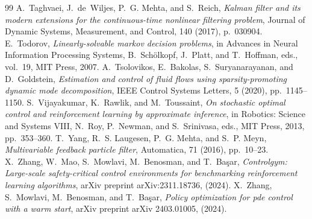 \documentclass[10pt,a4paper]{amsart}
\begin{document}
\begin{thebibliography}{99}
 {\sc A.~Taghvaei, J.~de~Wiljes, P.~G. Mehta, and S.~Reich}, {\em Kalman filter and its modern extensions for the continuous-time nonlinear filtering problem}, Journal of Dynamic Systems, Measurement, and Control, 140 (2017), p.~030904.
 {\sc E.~Todorov}, {\em Linearly-solvable markov decision problems}, in Advances in Neural Information Processing Systems, B.~Sch\"{o}lkopf, J.~Platt, and T.~Hoffman, eds., vol.~19, MIT Press, 2007.
 {\sc A.~Tsolovikos, E.~Bakolas, S.~Suryanarayanan, and D.~Goldstein}, {\em Estimation and control of fluid flows using sparsity-promoting dynamic mode decomposition}, IEEE Control Systems Letters, 5 (2020), pp.~1145--1150.
 {\sc S.~Vijayakumar, K.~Rawlik, and M.~Toussaint}, {\em On stochastic optimal control and reinforcement learning by approximate inference}, in Robotics: Science and Systems VIII, N.~Roy, P.~Newman, and S.~Srinivasa, eds., MIT Press, 2013, pp.~353--360.
 {\sc T.~Yang, R.~S. Laugesen, P.~G. Mehta, and S.~P. Meyn}, {\em Multivariable feedback particle filter}, Automatica, 71 (2016), pp.~10--23.
 {\sc X.~Zhang, W.~Mao, S.~Mowlavi, M.~Benosman, and T.~Ba{\c{s}}ar}, {\em Controlgym: Large-scale safety-critical control environments for benchmarking reinforcement learning algorithms}, arXiv preprint arXiv:2311.18736, (2024).
 {\sc X.~Zhang, S.~Mowlavi, M.~Benosman, and T.~Başar}, {\em Policy optimization for pde control with a warm start}, arXiv preprint arXiv 2403.01005, (2024).
\end{thebibliography}
\end{document}
